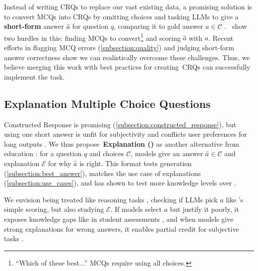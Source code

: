 Instead of writing CRQs to replace our vast existing \mcqa data, a promising solution is to convert MCQs into CRQs by omitting choices and tasking LLMs to give a \textbf{short-form} answer $\hat{a}$ for question $q$, comparing it to gold answer $a \in \mathcal{C}$ \cite{bhakthavatsalam2021think}.
\citet{myrzakhan2024open}~show two hurdles in this: finding MCQs to convert\footnote{\;``Which of these best...'' MCQs require using all choices.} and scoring $\hat{a}$ with $a$. 
Recent efforts in flagging MCQ errors (\cref{subsection:quality}) and judging short-form answer correctness \cite{li-etal-2024-pedants} show we can realistically overcome these challenges.
Thus, we believe merging this work with best practices for creating~CRQs \cite{snow2012construct} can successfully implement the task.


\subsection{Explanation Multiple Choice Questions} \label{subsection:justified_mcqa}

Constructed Response is promising (\cref{subsection:constructed_response}), but using one short answer is unfit for subjectivity \cite{lin2020differentiable} and conflicts user preferences for long outputs \cite{zheng2024judging}.
We thus propose~\textbf{Explanation \mcqa (\emcqa)} as another \mcqa alternative from education \cite{lau2011guessing}: for a question $q$ and choices $\mathcal{C}$, models give an answer $\hat{a} \in \mathcal{C}$ and explanation $\mathcal{E}$ for why $\hat{a}$ is right.
This format tests generation (\cref{subsection:best_answer}), matches the use case of explanations (\cref{subsection:use_cases}), and has shown to test more knowledge levels over \mcqa \cite{lee2011validating}.


We envision \emcqa being treated like reasoning tasks \cite{cobbe2021training}, checking if LLMs pick $a$ like \mcqa's simple scoring, but also studying $\mathcal{E}$.
If models select $a$ but justify it poorly, it exposes knowledge gaps like in student assessments \cite{jonassen2010arguing}, and when models give strong explanations for wrong answers, it enables partial credit for subjective tasks \cite{lau2011guessing}.

